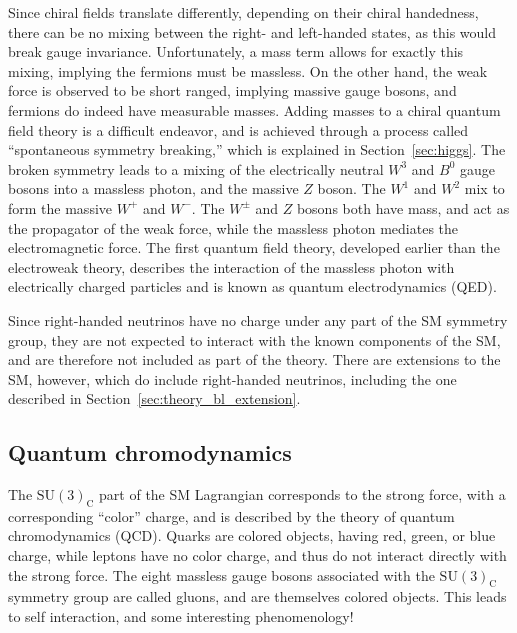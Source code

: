 Since chiral fields translate differently, depending on their chiral handedness,
there can be no mixing between the right- and left-handed states, as this would
break gauge invariance.
Unfortunately, a mass term allows for exactly this mixing, implying the
fermions must be massless.
On the other hand, the weak force is observed to be short ranged, implying
massive gauge bosons, and fermions do indeed have measurable masses.
Adding masses to a chiral quantum field theory is a difficult endeavor, and
is achieved through a process called ``spontaneous symmetry breaking,'' which
is explained in Section~\ref{sec:higgs}.
The broken symmetry leads to a mixing of the electrically neutral $W^3$ and
$B^0$ gauge bosons into a massless photon, and the massive $Z$ boson.
The $W^1$ and $W^2$ mix to form the massive $W^{+}$ and $W^{-}$.
The $W^{\pm}$ and $Z$ bosons both have mass, and act as the propagator of the
weak force, while the massless photon mediates the electromagnetic force.
The first quantum field theory, developed earlier than the electroweak theory,
describes the interaction of the massless photon with electrically charged
particles and is known as quantum electrodynamics (QED).

Since right-handed neutrinos have no charge under any part of the SM symmetry
group, they are not expected to interact with the known components of the SM,
and are therefore not included as part of the theory.
There are extensions to the SM, however, which do include right-handed
neutrinos, including the one described in Section~\ref{sec:theory_bl_extension}.

\subsection{Quantum chromodynamics}
\label{sec:qcd}

The $\mathrm{SU}(3)_\mathrm{C}$ part of the SM Lagrangian corresponds to the
strong force, with a corresponding ``color'' charge, and is described by the
theory of quantum chromodynamics (QCD).
Quarks are colored objects, having red, green, or blue charge, while leptons
have no color charge, and thus do not interact directly with the strong
force.
The eight massless gauge bosons associated with the
$\mathrm{SU}(3)_\mathrm{C}$ symmetry group are called gluons, and are
themselves colored objects.
This leads to self interaction, and some interesting phenomenology!

